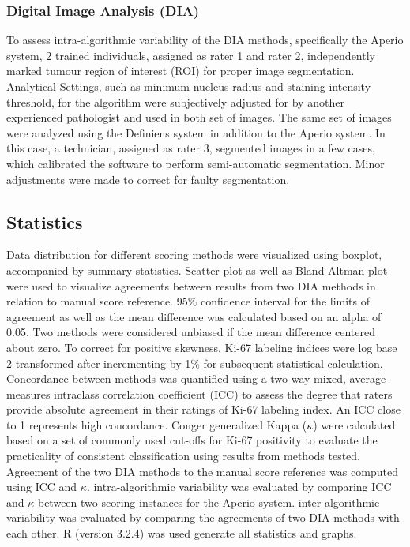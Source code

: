 \documentclass[final,5p,times,twocolumn]{elsarticle}
\begin{document}
\subsubsection*{Digital Image Analysis (DIA)}
To assess intra-algorithmic variability of the DIA methods, specifically the Aperio system, 2 trained individuals, assigned as rater 1 and rater 2, independently marked tumour region of interest (ROI) for proper image segmentation. Analytical Settings, such as minimum nucleus radius and staining intensity threshold, for the algorithm were subjectively adjusted for by another experienced pathologist and used in both set of images. The same set of images were analyzed using the Definiens system in addition to the Aperio system. In this case, a technician, assigned as rater 3, segmented images in a few cases, which calibrated the software to perform semi-automatic segmentation. Minor adjustments were made to correct for faulty segmentation.

\subsection*{Statistics}
Data distribution for different scoring methods were visualized using boxplot, accompanied by summary statistics. Scatter plot as well as Bland-Altman plot were used to visualize agreements between results from two DIA methods in relation to manual score reference. \cite{Bland1986} 95\% confidence interval for the limits of agreement as well as the mean difference was calculated based on an alpha of 0.05. Two methods were considered unbiased if the mean difference centered about zero. \cite{Hanneman2008} To correct for positive skewness, Ki-67 labeling indices were log base 2 transformed after incrementing by 1\% for subsequent statistical calculation. Concordance between methods was quantified using a two-way mixed, average-measures intraclass correlation coefficient (ICC) to assess the degree that raters provide absolute agreement in their ratings of Ki-67 labeling index. \cite{Shrout1979} An ICC close to 1 represents high concordance. Conger generalized Kappa ($\kappa$) were calculated based on a set of commonly used cut-offs for Ki-67 positivity to evaluate the practicality of consistent classification using results from methods tested. \cite{Conger1980} Agreement of the two DIA methods to the manual score reference was computed using ICC and $\kappa$. intra-algorithmic variability was evaluated by comparing ICC and $\kappa$ between two scoring instances for the Aperio system. inter-algorithmic variability was evaluated by comparing the agreements of two DIA methods with each other. R (version 3.2.4) was used generate all statistics and graphs.
\end{document}
